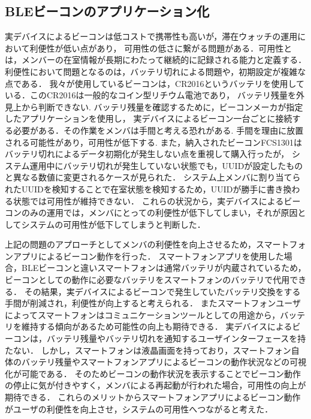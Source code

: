 


\subsection{ BLEビーコンのアプリケーション化}




実デバイスによるビーコンは低コストで携帯性も高いが，滞在ウォッチの運用において利便性が低い点があり，
可用性の低さに繋がる問題がある．可用性とは，メンバーの在室情報が長期にわたって継続的に記録される能力と定義する．
利便性において問題となるのは，バッテリ切れによる問題や，初期設定が複雑な点である．
我々が使用しているビーコンは，CR2016というバッテリを使用している．このCR2016は一般的なコイン型リチウム電池であり，
バッテリ残量を外見上から判断できない.
バッテリ残量を確認するために，ビーコンメーカが指定したアプリケーションを使用し，
実デバイスによるビーコン一台ごとに接続する必要がある．その作業をメンバは手間と考える恐れがある.
手間を理由に放置される可能性があり，可用性が低下する.
また，納入されたビーコンFCS1301はバッテリ切れによるデータ初期化が発生しない点を重視して購入行ったが，
システム運用中にバッテリ切れが発生していない状態でも，UUIDが設定したものと異なる数値に変更されるケースが見られた．
システム上メンバに割り当てられたUUIDを検知することで在室状態を検知するため，UUIDが勝手に書き換わる状態では可用性が維持できない．
これらの状況から，実デバイスによるビーコンのみの運用では，メンバにとっての利便性が低下してしまい，それが原因としてシステムの可用性が低下してしまうと判断した．


上記の問題のアプローチとしてメンバの利便性を向上させるため，スマートフォンアプリによるビーコン動作を行った．
スマートフォンアプリを使用した場合，BLEビーコンと違いスマートフォンは通常バッテリが内蔵されているため，ビーコンとしての動作に必要なバッテリをスマートフォンのバッテリで代用できる．
その結果，実デバイスによるビーコンで発生していたバッテリ交換をする手間が削減され，利便性が向上すると考えられる．
またスマートフォンユーザによってスマートフォンはコミュニケーションツールとしての用途から，バッテリを維持する傾向があるため可能性の向上も期待できる．
実デバイスによるビーコンは，バッテリ残量やバッテリ切れを通知するユーザインターフェースを持たない．
しかし，スマートフォンは液晶画面を持っており，スマートフォン自体のバッテリ残量やスマートフォンアプリによるビーコンの動作状況などの可視化が可能である．
そのためビーコンの動作状況を表示することでビーコン動作の停止に気が付きやすく，メンバによる再起動が行われた場合，可用性の向上が期待できる．
これらのメリットからスマートフォンアプリによるビーコン動作がユーザの利便性を向上させ，システムの可用性へつながると考えた．



